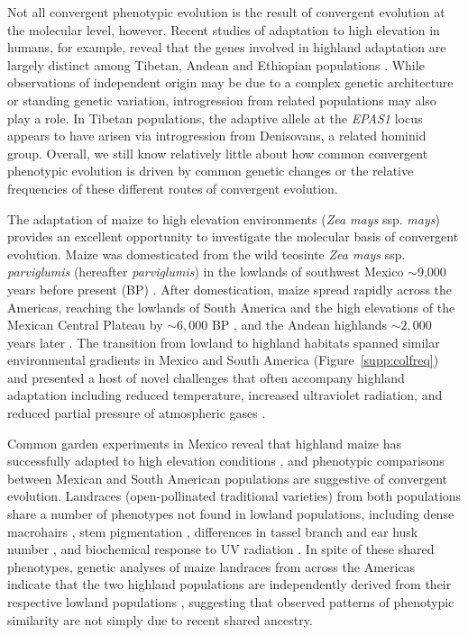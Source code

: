 Not all convergent phenotypic evolution is the result of convergent evolution at the molecular level, however.  
Recent studies of adaptation to high elevation in humans, for example, reveal that the genes involved in highland adaptation are largely distinct among Tibetan, Andean and Ethiopian populations \cite[]{Bigham_2010_20838600,Scheinfeldt_2012_22264333,Alkorta-Aranburu_2012_23236293}. 
While observations of independent origin may be due to a complex genetic architecture or standing genetic variation, introgression from related populations may also play a role.  
In Tibetan populations, the adaptive allele at the \emph{EPAS1} locus appears to have arisen via introgression from Denisovans, a related hominid group.
Overall, we still know relatively little about how common convergent phenotypic evolution is driven by common genetic changes or the relative frequencies of these different routes of convergent evolution.

The adaptation of maize to high elevation environments (\emph{Zea mays} ssp. \emph{mays}) provides an excellent opportunity to investigate the molecular basis of convergent evolution.  
Maize was domesticated from the wild teosinte \emph{Zea mays} ssp. \emph{parviglumis} (hereafter \emph{parviglumis}) in the lowlands of southwest Mexico $\sim$9,000 years before present (BP) \cite[]{Matsuoka_2002_11983901,Piperno_2009_19307570,vanHeerwaarden_2011_21189301}. 
After domestication, maize spread rapidly across the Americas, reaching the lowlands of South America and the high elevations of the Mexican Central Plateau by $\sim 6,000$ BP \cite[]{Piperno_2006_69}, and the Andean highlands $\sim 2,000$ 
years later \cite[]{Perry_2006_16511492,Grobman_2012_22307642}. 
The transition from lowland to highland habitats spanned similar environmental gradients in Mexico and South America (Figure~\ref{supp:colfreq}) and presented a host of novel challenges that often accompany highland adaptation including reduced temperature, increased ultraviolet radiation, and reduced partial pressure of atmospheric gases \cite[]{Korner_2007_17988759}.

Common garden experiments in Mexico reveal that highland maize has successfully adapted to high elevation conditions \cite[]{Mercer2008}, and phenotypic comparisons between Mexican and South American populations are suggestive of convergent evolution.  
Landraces (open-pollinated traditional varieties) from both populations share a number of phenotypes not found in lowland populations, including dense macrohairs \cite[]{Wilkes_1977,Wellhausen1957:book}, stem pigmentation \cite[]{Wilkes_1977,Wellhausen1957:book}, differences in tassel branch and ear husk number \cite[]{brewbaker2014diversity}, and biochemical response to UV radiation \cite[]{Casati2005}. 
In spite of these shared phenotypes, genetic analyses of maize landraces from across the Americas indicate that the two highland populations are independently derived from their respective lowland populations \cite[]{Vigouroux_2008_21632329, vanHeerwaarden_2011_21189301}, suggesting that observed patterns of phenotypic similarity are not simply due to recent shared ancestry. 

